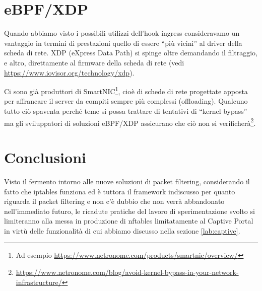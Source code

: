 \section{eBPF/XDP}
Quando abbiamo visto i possibili utilizzi dell'hook ingress consideravamo
un vantaggio in termini di prestazioni quello di essere ``pi\`u vicini'' al
driver della scheda di rete. XDP (eXpress Data Path) si spinge oltre
demandando il filtraggio, e altro, direttamente al firmware della scheda di
rete (vedi \url{https://www.iovisor.org/technology/xdp}).

Ci sono gi\`a produttori di SmartNIC\footnote{Ad esempio
    \url{https://www.netronome.com/products/smartnic/overview/}}, cio\`e di
    schede di rete progettate apposta per affrancare il server 
    da compiti sempre pi\`u complessi (offloading).  Qualcuno
    tutto ci\`o spaventa perch\'e teme si possa trattare di tentativi di
    ``kernel
    bypass'' ma gli sviluppatori di soluzioni eBPF/XDP assicurano che ci\`o
    non si
    verificher\`a\footnote{\url{https://www.netronome.com/blog/avoid-kernel-bypass-in-your-network-infrastructure/}}.

\section{Conclusioni}

Visto il fermento intorno alle nuove soluzioni di packet filtering,
considerando il fatto che iptables funziona ed \`e tuttora il framework
indiscusso per quanto riguarda il packet filtering e non c'\`e dubbio che non
verr\`a abbandonato nell'immediato futuro, le ricadute pratiche del lavoro di
sperimentazione svolto si limiteranno alla messa in produzione di nftables
limitatamente al Captive Portal in virt\`u delle funzionalit\`a di cui abbiamo
discusso nella sezione \ref{lab:captive}.
